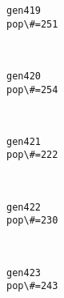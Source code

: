 \documentclass[11pt]{article}
\begin{document}
    \begin{Verbatim}[commandchars=\\\{\}]
gen419
pop\#=251

    \end{Verbatim}

    \begin{center}
    \end{center}
    { \hspace*{\fill} \\}
    
    \begin{Verbatim}[commandchars=\\\{\}]
gen420
pop\#=254

    \end{Verbatim}

    \begin{center}
    \end{center}
    { \hspace*{\fill} \\}
    
    \begin{Verbatim}[commandchars=\\\{\}]
gen421
pop\#=222

    \end{Verbatim}

    \begin{center}
    \end{center}
    { \hspace*{\fill} \\}
    
    \begin{Verbatim}[commandchars=\\\{\}]
gen422
pop\#=230

    \end{Verbatim}

    \begin{center}
    \end{center}
    { \hspace*{\fill} \\}
    
    \begin{Verbatim}[commandchars=\\\{\}]
gen423
pop\#=243

    \end{Verbatim}
\end{document}

